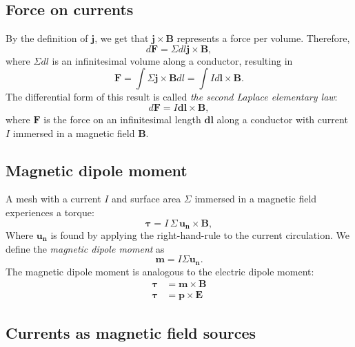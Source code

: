 \documentclass[a4paper, 12pt]{article}
\renewcommand{\vec}[1]{\mathbf{#1}}
\newcommand{\E}{\ensuremath{\vec{E}}}
\renewcommand{\j}{\ensuremath{\vec{j}}}
\newcommand{\B}{\ensuremath{\vec{B}}}
\begin{document}
    \subsection{Force on currents}
        By the definition of \j, we get that $\j \times \B$ represents a force per volume. Therefore, 
        \begin{equation}
            d\vec{F} = \Sigma dl \j \times \B, 
        \end{equation}
        where $\Sigma dl$ is an infinitesimal volume along a conductor, resulting in 
        \begin{equation}
            \vec{F} = \int \Sigma \j \times \B dl = \int I d\vec{l} \times \B.
        \end{equation}
        The differential form of this result is called \textit{the second Laplace elementary law}:
        \begin{equation}
            d\vec{F} = I\vec{dl} \times \B,
        \end{equation}
        where $\vec{F}$ is the force on an infinitesimal length $\vec{dl}$ along a conductor with current $I$ 
        immersed in a magnetic field $\B$.
        
    \subsection{Magnetic dipole moment}
    
        A mesh with a current $I$ and surface area $\Sigma$ immersed in a magnetic field experiences a torque:
        \begin{equation}
            \vec{\tau} = I\,\Sigma\,\vec{u_n}\times\B,
        \end{equation}
        Where $\vec{u_n}$ is found by applying the right-hand-rule to the current circulation. 
        We define the \textit{magnetic dipole moment} as
        \begin{equation}
            \vec{m} = I\Sigma\vec{u_n}.
        \end{equation}
        The magnetic dipole moment is analogous to the electric dipole moment: 
        \begin{align*}
            \vec{\tau} &= \vec{m} \times \B\\
            \vec{\tau} &= \vec{p} \times \E
        \end{align*}
    
    \subsection{Currents as magnetic field sources}
    
\end{document}
